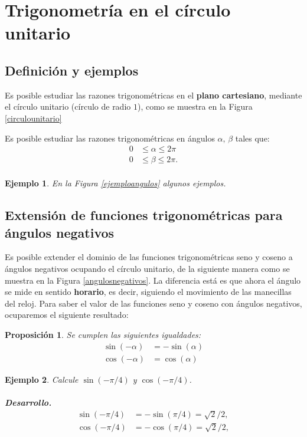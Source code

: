 \documentclass[10pt]{article}
\newcommand{\2}[1]{\hspace{-0.93cm}\colorbox{color1}{\hspace{0.07cm} \parbox{17cm}{\vspace{0.2cm} #1}\hspace*{0.07cm} }}
\newcommand{\3}[1]{\hspace{-0.93cm}\colorbox{color7}{\hspace{0.07cm} \parbox{17cm}{\vspace{0.2cm} #1}\hspace*{0.07cm} }}
\theoremstyle{theorem}
\newtheorem{pro}{Proposici\'on}%
\newtheorem{eje}{Ejemplo}%
\numberwithin{equation}{section}
\begin{document}
\section{Trigonometr\'ia en el c\'irculo unitario}

\subsection{Definici\'on y ejemplos}
Es posible estudiar las razones trigonom\'etricas en el \textbf{plano cartesiano}, mediante el c\'irculo unitario (c\'irculo de radio $1$), como se muestra en la Figura \ref{circulounitario}

Es posible estudiar las razones trigonom\'etricas en \'angulos $\alpha,\, \beta$ tales que: 
\begin{align*}
0&\leq\alpha\leq 2\pi\\
0&\leq\beta\leq 2\pi.\\ 
\end{align*}

\begin{eje}
En la Figura \ref{ejemploangulos} algunos ejemplos.

\end{eje}


\subsection{Extensi\'on de funciones trigonom\'etricas para \'angulos negativos}

Es posible extender el dominio de las funciones trigonom\'etricas seno y coseno a \'angulos negativos ocupando el c\'irculo unitario, de la siguiente manera como se muestra en la Figura \ref{angulosnegativos}. La diferencia est\'a es que ahora el \'angulo se mide en sentido \textbf{horario}, es decir, siguiendo el movimiento de las manecillas del reloj. Para saber el valor de las funciones seno y coseno con \'angulos negativos, ocuparemos el siguiente resultado:

\begin{pro}
Se cumplen las siguientes igualdades:
\begin{align*}
\sin(-\alpha)&= -\sin(\alpha)\\
\cos(-\alpha)&=\cos(\alpha)
\end{align*}
\end{pro}


\begin{eje}
Calcule $\sin(-\pi/4)$ y $\cos(-\pi/4)$.
\\\\
\textbf{Desarrollo.}
\begin{align*}
\sin(-\pi/4)&=-\sin(\pi/4)=\sqrt{2}/2,\\
\cos(-\pi/4)&=-\cos(\pi/4)=\sqrt{2}/2,
\end{align*}
\end{eje}
\end{document}
